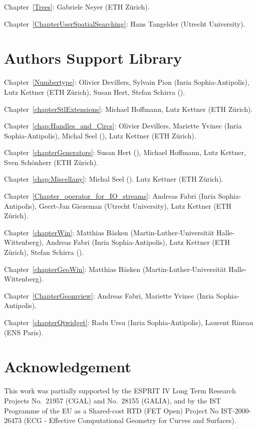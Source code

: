 \noindent
Chapter~\ref{Trees}: Gabriele Neyer (ETH Z\"urich).

\noindent
Chapter~\ref{ChapterUserSpatialSearching}: Hans Tangelder (Utrecht University).

\section*{Authors Support Library}

Chapter~\ref{Numbertype}: 
Olivier Devillers, Sylvain Pion ({\sc Inria} Sophia-Antipolis),
Lutz Kettner (ETH Z\"urich),
Susan Hert, Stefan Schirra ().

Chapter~\ref{chapterStlExtensions}: 
Michael Hoffmann, Lutz Kettner (ETH Z\"urich).

Chapter~\ref{chap:Handles_and_Circs}:
Olivier Devillers, Mariette Yvinec ({\sc Inria} Sophia-Antipolis),
Michal Seel (),
Lutz Kettner (ETH Z\"urich).

Chapter~\ref{chapterGenerators}: 
Susan Hert (),
Michael Hoffmann, Lutz Kettner, Sven Sch\"onherr (ETH Z\"urich).

Chapter~\ref{chap:Miscellany}:
Michal Seel ().
Lutz Kettner (ETH Z\"urich).

Chapter~\ref{Chapter_operator_for_IO_streams}: 
Andreas Fabri ({\sc Inria} Sophia-Antipolis),
Geert-Jan Giezeman (Utrecht University),
Lutz Kettner (ETH Z\"urich).

Chapter~\ref{chapterWin}:
Matthias B\"asken (Martin-Luther-Universit{\"a}t Halle-Wittenberg),
Andreas Fabri ({\sc Inria} Sophia-Antipolis),
Lutz Kettner (ETH Z\"urich),
Stefan Schirra ().

Chapter~\ref{chapterGeoWin}:
Matthias B\"asken (Martin-Luther-Universit{\"a}t Halle-Wittenberg).

Chapter~\ref{ChapterGeomview}:
Andreas Fabri, Mariette Yvinec ({\sc Inria} Sophia-Antipolis).

Chapter~\ref{chapterQtwidget}:
Radu Ursu ({\sc Inria} Sophia-Antipolis),
Laurent Rineau (ENS Paris).



\section*{Acknowledgement}


This work was partially supported by the ESPRIT IV Long Term Research
Projects No.~21957 (CGAL) and No.~28155 (GALIA), and by the IST
Programme of the EU as a Shared-cost RTD (FET Open) Project No
IST-2000-26473 (ECG - Effective Computational Geometry for Curves and
Surfaces).


